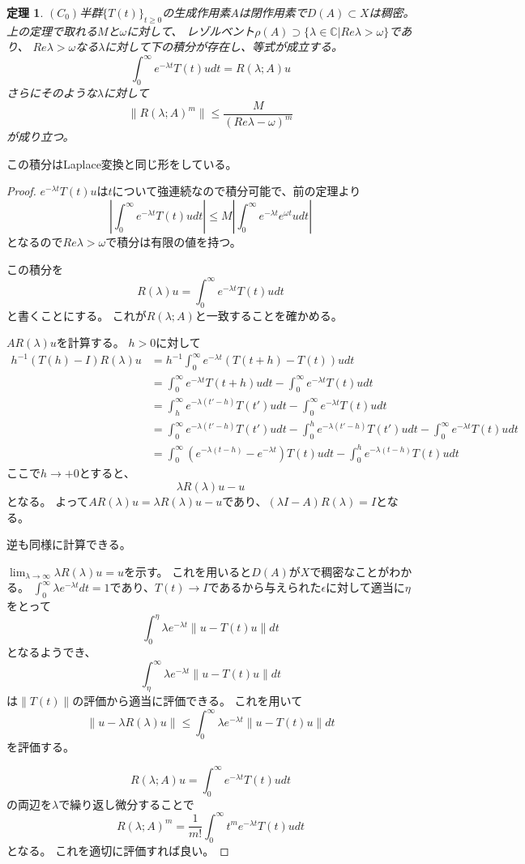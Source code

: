\documentclass{jsarticle}
\newtheorem{thm}{定理}
\newcommand{\C}{\mathbb{C}}
\newcommand{\abs}[1]{|#1|}
\newcommand{\norm}[1]{\|#1\|}
\begin{document}
\begin{thm}
$(C_0)$半群$\{T(t)\}_{t\geq0}$の生成作用素$A$は閉作用素で$D(A)\subset X$は稠密。
上の定理で取れる$M$と$\omega$に対して、
レゾルベント$\rho(A)\supset\{\lambda\in\C\vert Re\lambda>\omega\}$であり、
$Re\lambda>\omega$なる$\lambda$に対して下の積分が存在し、等式が成立する。
\[
\int^\infty_0e^{-\lambda t}T(t)udt=R(\lambda;A)u
\]
さらにそのような$\lambda$に対して
\[
\norm{R(\lambda;A)^m}\leq\frac{M}{(Re\lambda-\omega)^m}
\]
が成り立つ。
\end{thm}
この積分はLaplace変換と同じ形をしている。
\begin{proof}
$e^{-\lambda t}T(t)u$は$t$について強連続なので積分可能で、前の定理より
\[
\abs{\int^\infty_0e^{-\lambda t}T(t)udt}\leq M\abs{\int^\infty_0e^{-\lambda t}e^{\omega t}udt}
\]
となるので$Re\lambda>\omega$で積分は有限の値を持つ。

この積分を
\[
R(\lambda)u=\int^\infty_0e^{-\lambda t}T(t)udt
\]
と書くことにする。
これが$R(\lambda;A)$と一致することを確かめる。

$AR(\lambda)u$を計算する。
$h>0$に対して
\begin{align*}
h^{-1}(T(h)-I)R(\lambda)u
&=h^{-1}\int^\infty_0e^{-\lambda t}(T(t+h)-T(t))udt\\
&=\int^\infty_0e^{-\lambda t}T(t+h)udt-\int^\infty_0e^{-\lambda t}T(t)udt\\
&=\int^\infty_he^{-\lambda(t'-h)}T(t')udt-\int^\infty_0e^{-\lambda t}T(t)udt\\
&=\int^\infty_0e^{-\lambda(t'-h)}T(t')udt-\int^h_0e^{-\lambda(t'-h)}T(t')udt-\int^\infty_0e^{-\lambda t}T(t)udt\\
&=\int^\infty_0(e^{-\lambda(t-h)}-e^{-\lambda t})T(t)udt-\int^h_0e^{-\lambda(t-h)}T(t)udt
\end{align*}
ここで$h\to +0$とすると、
\[
\lambda R(\lambda)u-u
\]
となる。
よって$AR(\lambda)u=\lambda R(\lambda)u-u$であり、$(\lambda I-A)R(\lambda)=I$となる。

逆も同様に計算できる。

$\lim_{\lambda\to\infty}\lambda R(\lambda)u=u$を示す。
これを用いると$D(A)$が$X$で稠密なことがわかる。
$\int^\infty_0\lambda e^{-\lambda t}dt=1$であり、$T(t)\to I$であるから与えられた$\epsilon$に対して適当に$\eta$をとって
\[
\int^\eta_0\lambda e^{-\lambda t}\norm{u-T(t)u}dt
\]
となるようでき、
\[
\int^\infty_\eta\lambda e^{-\lambda t}\norm{u-T(t)u}dt
\]
は$\norm{T(t)}$の評価から適当に評価できる。
これを用いて
\[
\norm{u-\lambda R(\lambda)u}\leq\int^\infty_0\lambda e^{-\lambda t}\norm{u-T(t)u}dt
\]
を評価する。

\[
R(\lambda;A)u=\int^\infty_0e^{-\lambda t}T(t)udt
\]
の両辺を$\lambda$で繰り返し微分することで
\[
R(\lambda;A)^m=\frac{1}{m!}\int^\infty_0t^me^{-\lambda t}T(t)udt
\]
となる。
これを適切に評価すれば良い。
\end{proof}
\end{document}

